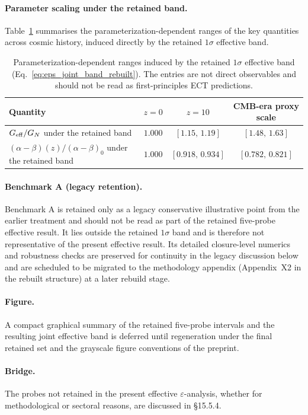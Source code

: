 \paragraph{Parameter scaling under the retained band.}
Table~\ref{tab:eps_scaling_benchmark_B} summarises the
parameterization-dependent ranges of the key quantities across cosmic
history, induced directly by the retained $1\sigma$ effective band.

\begin{table}[htbp]
\centering
\renewcommand{\arraystretch}{1.25}
\small
\begin{tabular}{@{}lccc@{}}
\toprule
\textbf{Quantity} & \textbf{$z = 0$} & \textbf{$z = 10$} & \textbf{CMB-era proxy scale} \\
\midrule
$G_{\rm eff}/G_N$ under the retained band
  & $1.000$ & $[1.15,\,1.19]$ & $[1.48,\,1.63]$ \\
$(\alpha - \beta)(z)/(\alpha - \beta)_0$ under the retained band
  & $1.000$ & $[0.918,\,0.934]$ & $[0.782,\,0.821]$ \\
\bottomrule
\end{tabular}
\caption{Parameterization-dependent ranges induced by the retained
$1\sigma$ effective band
(Eq.~\eqref{eq:eps_joint_band_rebuilt}). The entries are not direct
observables and should not be read as first-principles ECT
predictions.}
\label{tab:eps_scaling_benchmark_B}
\end{table}

\paragraph{Benchmark A (legacy retention).}
Benchmark A is retained only as a legacy conservative illustrative
point from the earlier treatment and should not be read as part of
the retained five-probe effective result. It lies outside the retained
$1\sigma$ band and is therefore not representative of the present
effective result. Its detailed closure-level numerics and robustness
checks are preserved for continuity in the legacy discussion below and
are scheduled to be migrated to the methodology appendix
(Appendix~X2 in the rebuilt structure) at a later rebuild stage.

\paragraph{Figure.}
A compact graphical summary of the retained five-probe intervals and
the resulting joint effective band is deferred until regeneration under
the final retained set and the grayscale figure conventions of the
preprint.

\paragraph{Bridge.}
The probes not retained in the present effective
$\varepsilon$-analysis, whether for methodological or sectoral
reasons, are discussed in \S15.5.4.

